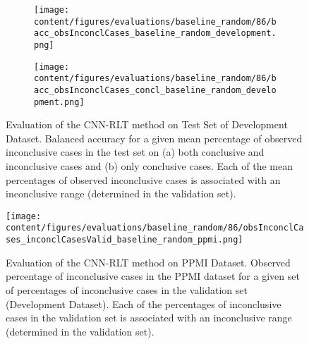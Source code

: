 \begin{figure}[t]
  \begin{subfigure}{0.9\textwidth}
    \centering
    \texttt{[image: content/figures/evaluations/baseline\_random/86/bacc\_obsInconclCases\_baseline\_random\_development.png]}
    \subcaption{}
    \label{fig:bacc_obsInconclCases_baseline_random_development}
  \end{subfigure}
  \hfill
  \begin{subfigure}{0.9\textwidth}
    \centering
    \texttt{[image: content/figures/evaluations/baseline\_random/86/bacc\_obsInconclCases\_concl\_baseline\_random\_development.png]}
    \subcaption{}
    \label{fig:bacc_obsInconclCases_concl_baseline_random_development}
  \end{subfigure}

  \caption{Evaluation of the CNN-RLT method on Test Set of Development Dataset.
  Balanced accuracy for a given mean percentage of observed inconclusive cases in the test set on 
  (a) both conclusive and inconclusive cases and (b) only conclusive cases. 
  Each of the mean percentages of observed inconclusive cases is associated with an inconclusive range (determined in the validation set). }
  \label{fig:bacc_obsInconclCases_baseline_random_development_full}
\end{figure}




\begin{figure}[h]
\centering
\texttt{[image: content/figures/evaluations/baseline\_random/86/obsInconclCases\_inconclCasesValid\_baseline\_random\_ppmi.png]}
\caption{Evaluation of the CNN-RLT method on PPMI Dataset.
Observed percentage of inconclusive cases in the PPMI dataset 
for a given set of percentages of inconclusive cases in the validation set (Development Dataset).
Each of the percentages of inconclusive cases in the validation set is associated 
with an inconclusive range (determined in the validation set).} 
\label{fig:obsInconclCases_inconclCasesValid_baseline_random_ppmi}
\end{figure} 


